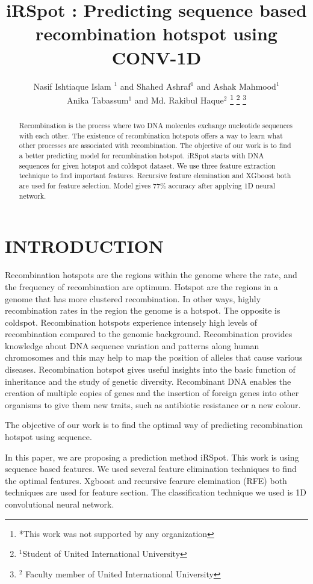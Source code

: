 \documentclass[letterpaper, 10 pt, conference]{ieeeconf}  %
\title{\LARGE \bf
iRSpot : Predicting sequence based recombination hotspot using CONV-1D
}
\author {Nasif Ishtiaque Islam $^{1}$ and Shahed Ashraf$^{1}$ and Ashak Mahmood$^{1}$ \\Anika Tabassum$^{1}$ 
and Md. Rakibul Haque$^{2}$ %
\thanks{*This work was not supported by any organization}%
\thanks{$^{1}$Student of United International University }%
\thanks{$^{2}$ Faculty member of United International University}%
}
\begin{document}
\maketitle
\thispagestyle{empty}
\pagestyle{empty}


\begin{abstract}
Recombination is the process where two DNA molecules exchange nucleotide sequences with each other.  The existence of recombination hotspots offers a way to learn what other processes are associated with recombination. The objective of our work is to find a better predicting model for recombination hotspot. iRSpot starts with DNA sequences for given hotspot and coldspot dataset. We use three feature extraction technique to find important features. Recursive feature elemination and XGboost both are used for feature selection. Model gives 77\% accuracy after applying 1D neural network.


\end{abstract}


\section{INTRODUCTION}

Recombination hotspots are the regions within the genome where the rate, and the frequency of recombination are optimum.
Hotspot are the regions in a genome that has more clustered recombination. In other ways, highly recombination rates in the region the genome is a hotspot. The opposite is coldspot. Recombination hotspots experience intensely high levels of recombination compared to the genomic background. Recombination provides knowledge about DNA sequence variation and patterns along human chromosomes and this may help to map the position of alleles that cause various diseases. Recombination hotspot gives useful insights into the basic function of inheritance and the study of genetic diversity. Recombinant DNA enables the creation of multiple copies of genes and the insertion of foreign genes into other organisms to give them new traits, such as antibiotic resistance or a new colour.



The objective of our work is to find the optimal way of predicting recombination hotspot using sequence.

In this paper, we are proposing a prediction method iRSpot. This work is using sequence based features. We used several feature elimination techniques to find the optimal features. Xgboost and recursive fearure elemination (RFE) both techniques are used for feature section. The classification technique we used is 1D convolutional neural network. 
 
\end{document}
